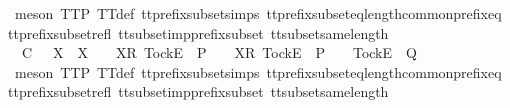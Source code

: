 \begin{isabellebody}
\ {\isacharparenleft}meson\ TT{}{\isacharunderscore}P\ TT{}{\isacharunderscore}def\ tt{\isacharunderscore}prefix{\isacharunderscore}subset{\isachardot}simps{\isacharparenleft}{}{\isacharparenright}\ tt{\isacharunderscore}prefix{\isacharunderscore}subset{\isacharunderscore}eq{\isacharunderscore}length{\isacharunderscore}common{\isacharunderscore}prefix{\isacharunderscore}eq\ tt{\isacharunderscore}prefix{\isacharunderscore}subset{\isacharunderscore}refl\ tt{\isacharunderscore}subset{\isacharunderscore}imp{\isacharunderscore}prefix{\isacharunderscore}subset\ tt{\isacharunderscore}subset{\isacharunderscore}same{\isacharunderscore}length{\isacharparenright}\isanewline
\ \ \isamarkupfalse%
\isanewline
\ \ \ \ \isamarkupfalse%
\ {\isachardoublequoteopen}{\isasymrho}{\isacharprime}\ {\isasymsubseteq}\isactrlsub C\ {\isasymrho}{\isacharprime}{\isacharprime}\ {\isasymLongrightarrow}\ X\ {\isasymsubseteq}\ X{\isacharprime}\ {\isasymLongrightarrow}\ {\isasymrho}{\isacharprime}{\isacharprime}\ {\isacharat}\ {\isacharbrackleft}{\isacharbrackleft}X{\isacharprime}{\isacharbrackright}\isactrlsub R{\isacharcomma}\ {\isacharbrackleft}Tock{\isacharbrackright}\isactrlsub E{\isacharbrackright}\ {\isasymin}\ P\ {\isasymLongrightarrow}\ {\isasymrho}{\isacharprime}\ {\isacharat}\ {\isacharbrackleft}{\isacharbrackleft}X{\isacharbrackright}\isactrlsub R{\isacharcomma}\ {\isacharbrackleft}Tock{\isacharbrackright}\isactrlsub E{\isacharbrackright}\ {\isasymnotin}\ P\ {\isasymLongrightarrow}\ {\isasymrho}{\isacharprime}\ {\isacharat}\ {\isacharbrackleft}{\isacharbrackleft}Tock{\isacharbrackright}\isactrlsub E{\isacharbrackright}\ {\isasymin}\ Q{\isachardoublequoteclose}\isanewline
\ \ \ \ \ \ \isamarkupfalse%
\ {\isacharparenleft}meson\ TT{}{\isacharunderscore}P\ TT{}{\isacharunderscore}def\ tt{\isacharunderscore}prefix{\isacharunderscore}subset{\isachardot}simps{\isacharparenleft}{}{\isacharparenright}\ tt{\isacharunderscore}prefix{\isacharunderscore}subset{\isacharunderscore}eq{\isacharunderscore}length{\isacharunderscore}common{\isacharunderscore}prefix{\isacharunderscore}eq\ tt{\isacharunderscore}prefix{\isacharunderscore}subset{\isacharunderscore}refl\ tt{\isacharunderscore}subset{\isacharunderscore}imp{\isacharunderscore}prefix{\isacharunderscore}subset\ tt{\isacharunderscore}subset{\isacharunderscore}same{\isacharunderscore}length{\isacharparenright}\isanewline
\ \ \isamarkupfalse%
\isanewline
\ \ \ \ \isamarkupfalse%

\end{isabellebody}
